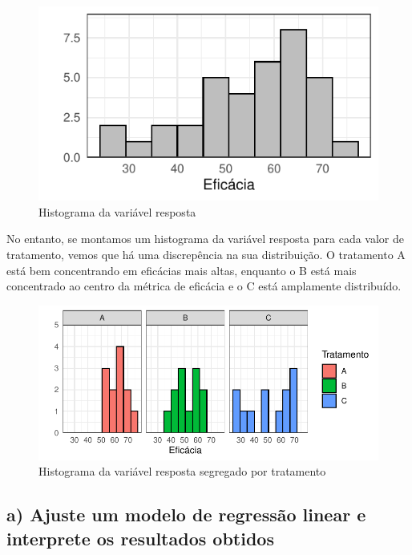 \documentclass[
  letterpaper,
  DIV=11,
  numbers=noendperiod]{scrartcl}
\begin{document}
\begin{figure}

{\centering \includegraphics{lista2_files/figure-pdf/histograma-q2-1.pdf}

}

\caption{Histograma da variável resposta}

\end{figure}

No entanto, se montamos um histograma da variável resposta para cada
valor de tratamento, vemos que há uma discrepência na sua distribuição.
O tratamento A está bem concentrando em eficácias mais altas, enquanto o
B está mais concentrado ao centro da métrica de eficácia e o C está
amplamente distribuído.

\begin{figure}

{\centering \includegraphics{lista2_files/figure-pdf/histograma-q2-facet-1.pdf}

}

\caption{Histograma da variável resposta segregado por tratamento}

\end{figure}

\hypertarget{a-ajuste-um-modelo-de-regressuxe3o-linear-e-interprete-os-resultados-obtidos}{%
\subsection{a) Ajuste um modelo de regressão linear e interprete os
resultados
obtidos}\label{a-ajuste-um-modelo-de-regressuxe3o-linear-e-interprete-os-resultados-obtidos}}
\end{document}
